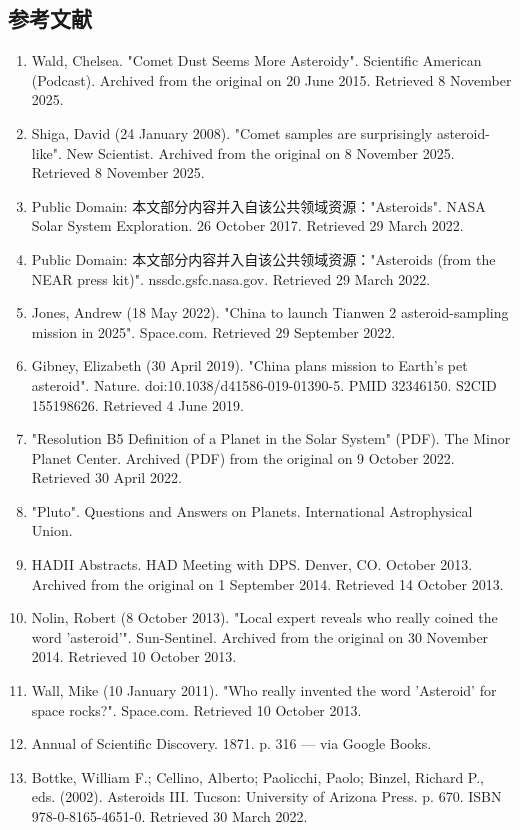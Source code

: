 \subsection{参考文献}
\begin{enumerate}
\item Wald, Chelsea. "Comet Dust Seems More Asteroidy". Scientific American (Podcast). Archived from the original on 20 June 2015. Retrieved 8 November 2025.
\item Shiga, David (24 January 2008). "Comet samples are surprisingly asteroid-like". New Scientist. Archived from the original on 8 November 2025. Retrieved 8 November 2025.
\item Public Domain: 本文部分内容并入自该公共领域资源："Asteroids". NASA Solar System Exploration. 26 October 2017. Retrieved 29 March 2022.
\item Public Domain: 本文部分内容并入自该公共领域资源："Asteroids (from the NEAR press kit)". nssdc.gsfc.nasa.gov. Retrieved 29 March 2022.
\item Jones, Andrew (18 May 2022). "China to launch Tianwen 2 asteroid-sampling mission in 2025". Space.com. Retrieved 29 September 2022.
\item Gibney, Elizabeth (30 April 2019). "China plans mission to Earth's pet asteroid". Nature. doi:10.1038/d41586-019-01390-5. PMID 32346150. S2CID 155198626. Retrieved 4 June 2019.
\item "Resolution B5 Definition of a Planet in the Solar System" (PDF). The Minor Planet Center. Archived (PDF) from the original on 9 October 2022. Retrieved 30 April 2022.
\item "Pluto". Questions and Answers on Planets. International Astrophysical Union.
\item HADII Abstracts. HAD Meeting with DPS. Denver, CO. October 2013. Archived from the original on 1 September 2014. Retrieved 14 October 2013.
\item Nolin, Robert (8 October 2013). "Local expert reveals who really coined the word 'asteroid'". Sun-Sentinel. Archived from the original on 30 November 2014. Retrieved 10 October 2013.
\item Wall, Mike (10 January 2011). "Who really invented the word 'Asteroid' for space rocks?". Space.com. Retrieved 10 October 2013.
\item Annual of Scientific Discovery. 1871. p. 316 — via Google Books.
\item Bottke, William F.; Cellino, Alberto; Paolicchi, Paolo; Binzel, Richard P., eds. (2002). Asteroids III. Tucson: University of Arizona Press. p. 670. ISBN 978-0-8165-4651-0. Retrieved 30 March 2022.

\end{enumerate}
